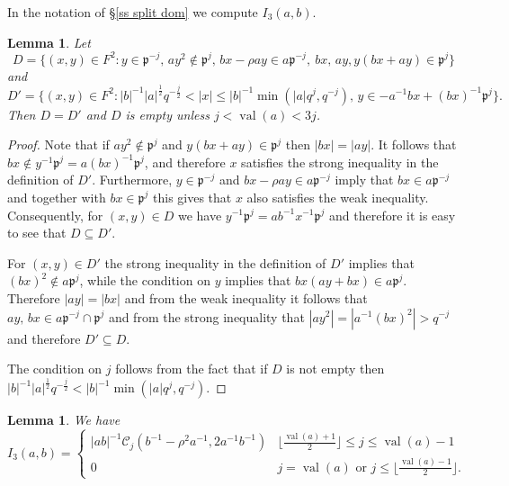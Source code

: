 \documentclass[12pt]{amsart}
\newcommand{\abs}[1]{\left|{#1}\right|}
\newcommand{\p}{\mathfrak{p}}
\newcommand{\val}{{\operatorname{val}}}
\newcommand{\Cu}{\mathcal{C}}
\newtheorem{lemma}[theorem]{Lemma}
\theoremstyle{remark}
\begin{document}
\subsubsection{} In the notation of \S\ref{ss split dom} we compute $I_3(a,b)$.
\begin{lemma}\label{lem dom D3}
Let
\[
D=\{(x,y)\in F^2:y\in \p^{-j},\,ay^2\not\in \p^j,\,bx-\rho ay\in a\p^{-j},\ bx,\,ay, y(bx+ay) \in \p^j\}
\]
and
\[
D'=\{(x,y)\in F^2:\abs{b}^{-1}\abs{a}^{\frac12}q^{-\frac{j}2}<\abs{x}\le \abs{b}^{-1}\min(\abs{a}q^j,q^{-j}),\,y\in - a^{-1}bx+(bx)^{-1}\p^{j}\}.
\]
Then $D=D'$ and $D$ is empty unless $j<\val(a)<3j$.
\end{lemma}
\begin{proof}
Note that if $ay^2\not\in \p^j$ and $y(bx+ay) \in \p^j$ then $\abs{bx}=\abs{ay}$. It follows that $bx\not\in y^{-1}\p^j=a(bx)^{-1}\p^j$, and therefore $x$ satisfies the strong inequality in the definition of $D'$.
Furthermore, $y\in \p^{-j}$ and $bx-\rho ay\in a\p^{-j}$ imply that $bx\in a\p^{-j}$ and together with $bx\in \p^j$ this gives that $x$ also satisfies the weak inequality.
Consequently, for $(x,y)\in D$ we have $y^{-1}\p^j=ab^{-1}x^{-1}\p^j$ and therefore it is easy to see that $D\subseteq D'$.

For $(x,y)\in D'$ the strong inequality in the definition of $D'$ implies that $(bx)^2\not\in a\p^j$, while the condition on $y$ implies that $bx(ay+bx)\in a\p^j$. Therefore $\abs{ay}=\abs{bx}$ and from the weak inequality it follows that $ay,\,bx\in a\p^{-j}\cap \p^j$ and from the strong inequality that $\abs{ay^2}=\abs{a^{-1}(bx)^2}>q^{-j}$ and therefore $D'\subseteq D$.

The condition on $j$ follows from the fact that if $D$ is not empty then $\abs{b}^{-1}\abs{a}^{\frac12}q^{-\frac{j}2}< \abs{b}^{-1}\min(\abs{a}q^j,q^{-j})$.
\end{proof}
\begin{lemma}\label{lem I3}
We have
\[
I_3(a,b)=\begin{cases}
\abs{ab}^{-1}\Cu_j(b^{-1}-\rho^2a^{-1},2a^{-1}b^{-1}) &  \lfloor \frac{\val(a)+1}2 \rfloor\le j\le \val(a)-1 \\
0 & j=\val(a)\text{ or } j\le \lfloor \frac{\val(a)-1}2 \rfloor.
\end{cases}
\]
\end{lemma}
\end{document}
